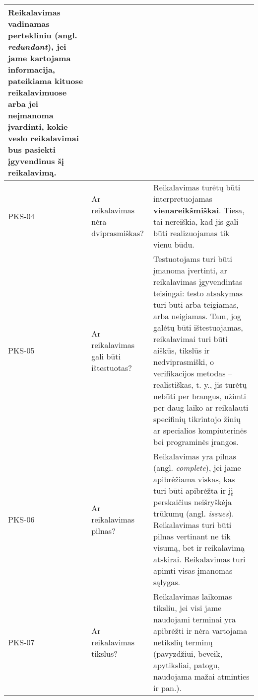 \documentclass{VUMIFPSkursinis}
\begin{document}
\begin{center}
\begin{longtable}{|C{2cm}|L{5cm}|L{8cm}|}
		Reikalavimas vadinamas pertekliniu (angl. \textit{redundant}), jei jame kartojama informacija, pateikiama kituose reikalavimuose arba jei neįmanoma įvardinti, kokie veslo reikalavimai bus pasiekti įgyvendinus šį reikalavimą.                                                                                                                                                                                                              \\ \hline
		PKS-04                                                                        &
		Ar reikalavimas nėra dviprasmiškas?                                           &
		Reikalavimas turėtų būti interpretuojamas \textbf{vienareikšmiškai}. Tiesa, tai nereiškia, kad jis gali būti realizuojamas tik vienu būdu.                                                                                                                                                                                                                                                                                                    \\ \hline
		PKS-05                                                                        &
		Ar reikalavimas gali būti ištestuotas?                                        &
		Testuotojams turi būti įmanoma įvertinti, ar reikalavimas įgyvendintas teisingai: testo atsakymas turi būti arba teigiamas, arba neigiamas. Tam, jog galėtų būti ištestuojamas, reikalavimai turi būti aiškūs, tikslūs ir nedviprasmiški, o verifikacijos metodas -- realistiškas, t. y., jis turėtų nebūti per brangus, užimti per daug laiko ar reikalauti specifinių tikrintojo žinių ar specialios kompiuterinės bei programinės įrangos. \\ \hline
		PKS-06                                                                        &
		Ar reikalavimas pilnas?                                                       &
		Reikalavimas yra pilnas (angl. \textit{complete}), jei jame apibrėžiama viskas, kas turi būti apibrėžta ir jį perskaičius neišryškėja trūkumų (angl. \textit{issues}). Reikalavimas turi būti pilnas vertinant ne tik visumą, bet ir reikalavimą atskirai. Reikalavimas turi apimti visas įmanomas sąlygas.                                                                                                                                   \\ \hline
		PKS-07                                                                        &
		Ar reikalavimas tikslus?                                                      &
		Reikalavimas laikomas tiksliu, jei visi jame naudojami terminai yra apibrėžti ir nėra vartojama netikslių terminų (pavyzdžiui, beveik, apytiksliai, patogu, naudojama mažai atminties ir pan.).                                                                                                                                                                                                                                               \\ \hline

\end{longtable}
\end{center}
\end{document}
